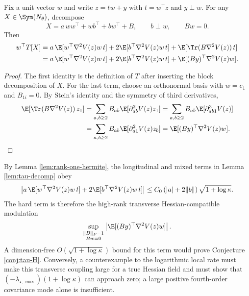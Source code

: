 \begin{lemma}\label{lem:tau-decomp}
    Fix a unit vector $w$ and write $z=t w+y$ with $t=w^\top z$ and $y\perp w$. For any $X\in\Sym(N_\theta)$, decompose
    \begin{equation*}
        X=a\,ww^\top+w b^\top+bw^\top+B,
        \qquad
        b\perp w,
        \qquad
        Bw=0.
    \end{equation*}
    Then
    \begin{align*}
        w^\top T[X]
        &=
        a\,\E[w^\top \nabla^2 V(z)w\,t]
        +
        2\E[b^\top\nabla^2 V(z)w\,t]
        +
        \E[\Tr(B\nabla^2 V(z))\,t]  \\
        &=
        a\,\E[w^\top \nabla^2 V(z)w\,t]
        +
        2\E[b^\top\nabla^2 V(z)w\,t]
        +
        \E[(By)^\top \nabla^2 V(z)w].
    \end{align*}
\end{lemma}

\begin{proof}
    The first identity is the definition of $T$ after inserting the block decomposition of $X$. For the last term, choose an orthonormal basis with $w=e_1$ and $B_{1i}=0$. By Stein's identity and the symmetry of third derivatives,
    \begin{align*}
        \E[\Tr(B\nabla^2 V(z))\,z_1]
        &=
        \sum_{a,b\geq 2} B_{ab}\E[\partial_{ab}^2 V(z)z_1]
        =
        \sum_{a,b\geq 2} B_{ab}\E[\partial_{ab1}^3 V(z)] \\
        &=
        \sum_{a,b\geq 2} B_{ab}\E[\partial_{a1}^2 V(z)z_b]
        =
        \E[(By)^\top \nabla^2 V(z)w].
    \end{align*}
\end{proof}

\begin{remark}
    By Lemma \ref{lem:rank-one-hermite}, the longitudinal and mixed terms in Lemma \ref{lem:tau-decomp} obey
    \begin{equation*}
        \left|
        a\,\E[w^\top \nabla^2 V(z)w\,t]
        +
        2\E[b^\top\nabla^2 V(z)w\,t]
        \right|
        \leq
        C_0\left(|a|+2\|b\|\right)\sqrt{1+\log\kappa}.
    \end{equation*}
    The hard term is therefore the high-rank transverse Hessian-compatible modulation
    \begin{equation*}
        \sup_{\substack{\|B\|_F=1\\ Bw=0}}
        \left|
        \E[(By)^\top \nabla^2 V(z)w]
        \right|.
    \end{equation*}
    A dimension-free $O(\sqrt{1+\log\kappa})$ bound for this term would prove Conjecture \ref{conj:tau-H}. Conversely, a counterexample to the logarithmic local rate must make this transverse coupling large for a true Hessian field and must show that $(-\lambda_{\star,\max})(1+\log\kappa)$ can approach zero; a large positive fourth-order covariance mode alone is insufficient.
\end{remark}

